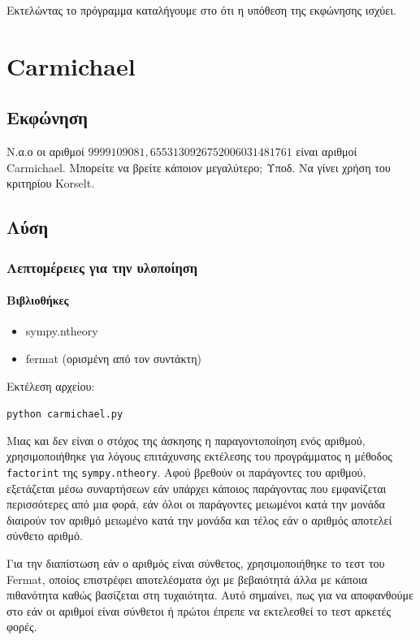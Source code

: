 \documentclass[oneside]{article}
\let\t\texttt
\begin{document}
Εκτελώντας το πρόγραμμα καταλήγουμε στο ότι η υπόθεση της εκφώνησης ισχύει.

\section{Carmichael}

\subsection{Εκφώνηση}

Ν.α.ο οι αριθμοί $9999109081, 6553130926752006031481761$ είναι αριθμοί Carmichael. Μπορείτε να βρείτε κάποιον μεγαλύτερο;
Υποδ. Να γίνει χρήση του κριτηρίου Korselt.

\subsection{Λύση} 

\subsubsection{Λεπτομέρειες για την υλοποίηση}

\paragraph{Βιβλιοθήκες}

\begin{itemize}
    \item sympy.ntheory
    \item fermat (ορισμένη από τον συντάκτη)
\end{itemize}

Εκτέλεση αρχείου:

\begin{center}
    \t{python carmichael.py}
\end{center}

Μιας και δεν είναι ο στόχος της άσκησης η παραγοντοποίηση ενός αριθμού, χρησιμοποιήθηκε για λόγους επιτάχυνσης εκτέλεσης του προγράμματος η μέθοδος \t{factorint} της \t{sympy.ntheory}. Αφού βρεθούν οι παράγοντες του αριθμού, εξετάζεται μέσω συναρτήσεων εάν υπάρχει κάποιος παράγοντας που εμφανίζεται περισσότερες από μια φορά, εάν όλοι οι παράγοντες μειωμένοι κατά την μονάδα διαιρούν τον αριθμό μειωμένο κατά την μονάδα και τέλος εάν ο αριθμός αποτελεί σύνθετο αριθμό.

Για την διαπίστωση εάν ο αριθμός είναι σύνθετος, χρησιμοποιήθηκε το τεστ του Fermat, οποίος επιστρέφει αποτελέσματα όχι με βεβαιότητά άλλα με κάποια πιθανότητα καθώς βασίζεται στη τυχαιότητα. Αυτό σημαίνει, πως για να αποφανθούμε στο εάν οι αριθμοί είναι σύνθετοι ή πρώτοι έπρεπε να εκτελεσθεί το τεστ αρκετές φορές.
\end{document}
